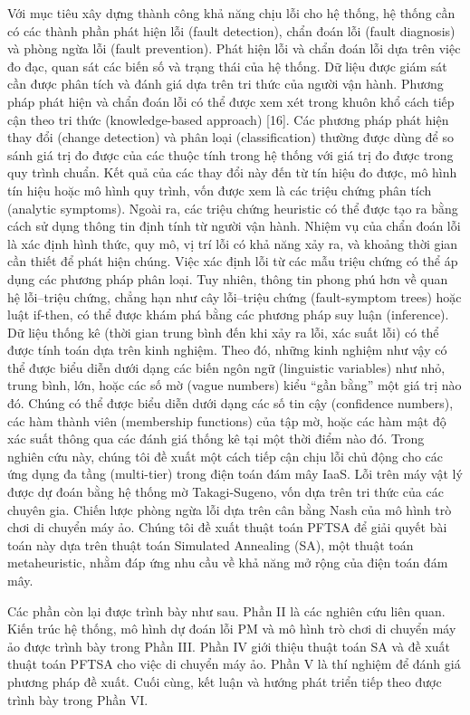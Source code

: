 \documentclass[
  vietnamese,
]{article}
\begin{document}
Với mục tiêu xây dựng thành công khả năng chịu lỗi cho hệ thống, hệ
thống cần có các thành phần phát hiện lỗi (fault detection), chẩn đoán
lỗi (fault diagnosis) và phòng ngừa lỗi (fault prevention). Phát hiện
lỗi và chẩn đoán lỗi dựa trên việc đo đạc, quan sát các biến số và trạng
thái của hệ thống. Dữ liệu được giám sát cần được phân tích và đánh giá
dựa trên tri thức của người vận hành. Phương pháp phát hiện và chẩn đoán
lỗi có thể được xem xét trong khuôn khổ cách tiếp cận theo tri thức
(knowledge-based approach) {[}16{]}. Các phương pháp phát hiện thay đổi
(change detection) và phân loại (classification) thường được dùng để so
sánh giá trị đo được của các thuộc tính trong hệ thống với giá trị đo
được trong quy trình chuẩn. Kết quả của các thay đổi này đến từ tín hiệu
đo được, mô hình tín hiệu hoặc mô hình quy trình, vốn được xem là các
triệu chứng phân tích (analytic symptoms). Ngoài ra, các triệu chứng
heuristic có thể được tạo ra bằng cách sử dụng thông tin định tính từ
người vận hành. Nhiệm vụ của chẩn đoán lỗi là xác định hình thức, quy
mô, vị trí lỗi có khả năng xảy ra, và khoảng thời gian cần thiết để phát
hiện chúng. Việc xác định lỗi từ các mẫu triệu chứng có thể áp dụng các
phương pháp phân loại. Tuy nhiên, thông tin phong phú hơn về quan hệ
lỗi--triệu chứng, chẳng hạn như cây lỗi--triệu chứng (fault-symptom
trees) hoặc luật if-then, có thể được khám phá bằng các phương pháp suy
luận (inference). Dữ liệu thống kê (thời gian trung bình đến khi xảy ra
lỗi, xác suất lỗi) có thể được tính toán dựa trên kinh nghiệm. Theo đó,
những kinh nghiệm như vậy có thể được biểu diễn dưới dạng các biến ngôn
ngữ (linguistic variables) như nhỏ, trung bình, lớn, hoặc các số mờ
(vague numbers) kiểu ``gần bằng'' một giá trị nào đó. Chúng có thể được
biểu diễn dưới dạng các số tin cậy (confidence numbers), các hàm thành
viên (membership functions) của tập mờ, hoặc các hàm mật độ xác suất
thông qua các đánh giá thống kê tại một thời điểm nào đó. Trong nghiên
cứu này, chúng tôi đề xuất một cách tiếp cận chịu lỗi chủ động cho các
ứng dụng đa tầng (multi-tier) trong điện toán đám mây IaaS. Lỗi trên máy
vật lý được dự đoán bằng hệ thống mờ Takagi-Sugeno, vốn dựa trên tri
thức của các chuyên gia. Chiến lược phòng ngừa lỗi dựa trên cân bằng
Nash của mô hình trò chơi di chuyển máy ảo. Chúng tôi đề xuất thuật toán
PFTSA để giải quyết bài toán này dựa trên thuật toán Simulated Annealing
(SA), một thuật toán metaheuristic, nhằm đáp ứng nhu cầu về khả
năng mở rộng của điện toán đám mây.

Các phần còn lại được trình bày như sau. Phần II là các nghiên cứu liên
quan. Kiến trúc hệ thống, mô hình dự đoán lỗi PM và mô hình trò chơi di
chuyển máy ảo được trình bày trong Phần III. Phần IV giới thiệu thuật
toán SA và đề xuất thuật toán PFTSA cho việc di chuyển máy ảo. Phần V là
thí nghiệm để đánh giá phương pháp đề xuất. Cuối cùng, kết luận và hướng
phát triển tiếp theo được trình bày trong Phần VI.
\end{document}
